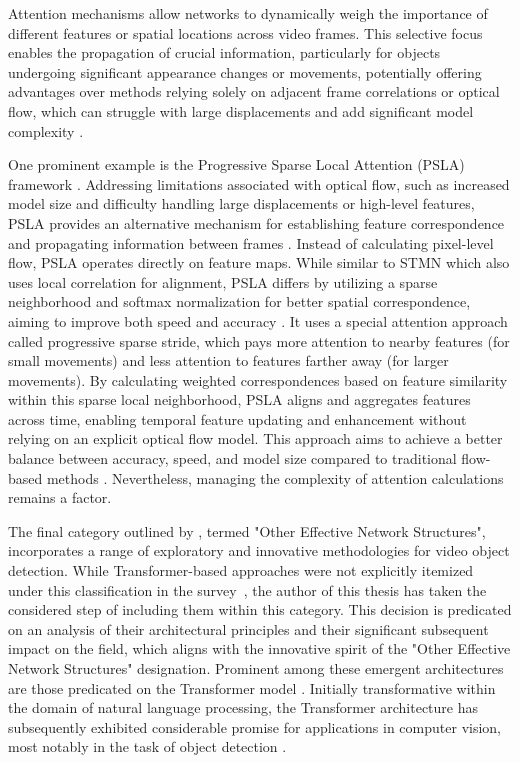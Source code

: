 Attention mechanisms allow networks to dynamically weigh the importance of different features or spatial locations across video frames. This selective focus enables the propagation of crucial information, particularly for objects undergoing significant appearance changes or movements, potentially offering advantages over methods relying solely on adjacent frame correlations or optical flow, which can struggle with large displacements and add significant model complexity \cite{jiaoNewGenerationDeep2022, guoProgressiveSparseLocal2019}.

One prominent example is the Progressive Sparse Local Attention (PSLA) framework \cite{guoProgressiveSparseLocal2019}. Addressing limitations associated with optical flow, such as increased model size and difficulty handling large displacements or high-level features, PSLA provides an alternative mechanism for establishing feature correspondence and propagating information between frames \cite{guoProgressiveSparseLocal2019}. Instead of calculating pixel-level flow, PSLA operates directly on feature maps. While similar to STMN \cite{xiaoVideoObjectDetection2018} which also uses local correlation for alignment, PSLA differs by utilizing a sparse neighborhood and softmax normalization for better spatial correspondence, aiming to improve both speed and accuracy \cite{guoProgressiveSparseLocal2019}. It uses a special attention approach called progressive sparse stride, which pays more attention to nearby features (for small movements) and less attention to features farther away (for larger movements). By calculating weighted correspondences based on feature similarity within this sparse local neighborhood, PSLA aligns and aggregates features across time, enabling temporal feature updating and enhancement without relying on an explicit optical flow model. This approach aims to achieve a better balance between accuracy, speed, and model size compared to traditional flow-based methods \cite{guoProgressiveSparseLocal2019}. Nevertheless, managing the complexity of attention calculations remains a factor.

The final category outlined by \cite{jiaoNewGenerationDeep2022}, termed "Other Effective Network Structures", incorporates a range of exploratory and innovative methodologies for video object detection. While Transformer-based approaches were not explicitly itemized under this classification in the survey~\cite{jiaoNewGenerationDeep2022}, the author of this thesis has taken the considered step of including them within this category. This decision is predicated on an analysis of their architectural principles and their significant subsequent impact on the field, which aligns with the innovative spirit of the "Other Effective Network Structures" designation. Prominent among these emergent architectures are those predicated on the Transformer model \cite{vaswaniAttentionAllYou2023}. Initially transformative within the domain of natural language processing, the Transformer architecture has subsequently exhibited considerable promise for applications in computer vision, most notably in the task of object detection \cite{carionEndtoEndObjectDetection2020}.

